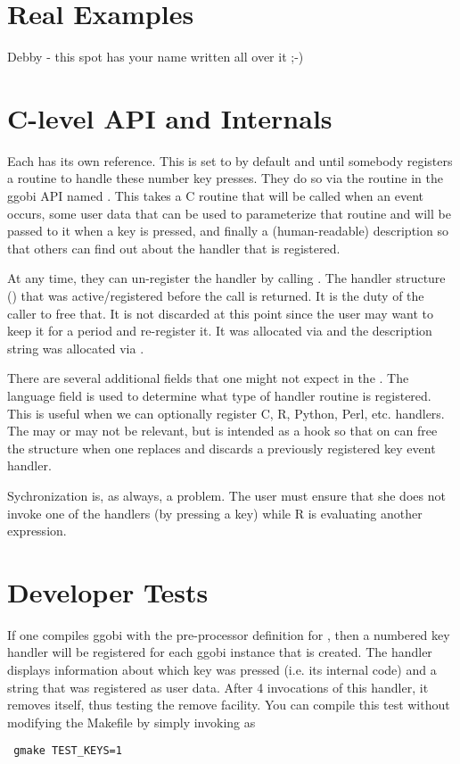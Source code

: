 \documentclass{article}
\begin{document}
\section{Real Examples}

Debby - this spot has your name written all over it ;-)

\section{C-level API and Internals}

Each  has its own  reference.
This is set to \CNull{} by default and until somebody registers a
routine to handle these number key presses. They do so via the routine
in the ggobi API named
.  This takes a C
routine that will be called when an event occurs, some user data that
can be used to parameterize that routine and will be passed to it when
a key is pressed, and finally a (human-readable) description so that
others can find out about the handler that is registered.

At any time, they can un-register the handler by calling
.  The handler
structure () that was active/registered
before the call is returned. It is the duty of the caller to free
that.  It is not discarded at this point since the user may want to
keep it for a period and re-register it. It was allocated via
 and the description string was allocated via
.

There are several additional fields that one might not expect in the
.  The language field is used to determine
what type of handler routine is registered. This is useful when we can
optionally register C, R, Python, Perl, etc. handlers.  The
 may or may not be relevant, but is intended as a
hook so that on can free the  structure when one
replaces and discards a previously registered key event handler.


Sychronization is, as always, a problem. The user must ensure that she
does not invoke one of the handlers (by pressing a key) while R is
evaluating another expression.


\section{Developer Tests}

If one compiles ggobi with the pre-processor definition for
, then a numbered key handler will be registered
for each ggobi instance that is created.  The handler displays
information about which key was pressed (i.e. its internal code) and a
string that was registered as user data. After 4 invocations of this
handler, it removes itself, thus testing the remove facility.
You can compile this test without modifying the Makefile
by simply invoking  as
\begin{verbatim}
 gmake TEST_KEYS=1
\end{verbatim}
\end{document}
